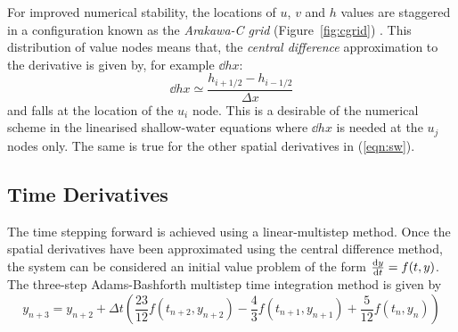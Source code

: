 \documentclass[a4paper, sfsidenotes, twoside]{tufte-handout}
\begin{document}
  \noindent For improved numerical stability, the locations of $u$, $v$ and $h$ values are staggered in a configuration known as the \emph{Arakawa-C grid} (Figure~\ref{fig:cgrid}) \cite{Arakawa:1981bx}.
  This distribution of value nodes means that, the \emph{central difference} approximation to the derivative is given by, for example $\dd{h}{x}$:
  \begin{equation}
    \dd{h}{x} \simeq \frac{h_{i+1/2} - h_{i-1/2}}{\Delta x}
  \end{equation}
  and falls at the location of the $u_i$ node.
  This is a desirable of the numerical scheme in the linearised shallow-water equations where $\dd{h}{x}$ is needed at the $u_j$ nodes only.  The same is true for the  other spatial derivatives in (\ref{eqn:sw}).

  \subsection{Time Derivatives}
  \label{sub:timederiv}
  The time stepping forward is achieved using a linear-multistep method.
  Once the spatial derivatives have been approximated using the central difference method, the system can be considered an initial value problem of the form $ \frac{\operatorname{d}\!{} y}{\operatorname{d}\!{t}} = f(t, y) $.
  The three-step Adams-Bashforth multistep time integration method is given by \cite{Parker:2012ii}
  \begin{equation}
    y_{n+3} = y_{n+2} + \Delta t \left( \frac{23}{12} f(t_{n+2}, y_{n+2}) - \frac{4}{3} f(t_{n+1}, y_{n+1}) + \frac{5}{12}f(t_n, y_n)\right)
  \end{equation}

\pagebreak


\end{document}
